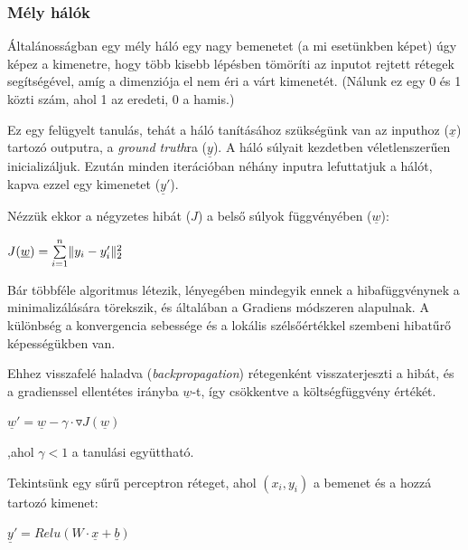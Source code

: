 

\subsubsection{Mély hálók}

Általánosságban egy mély háló egy nagy bemenetet (a mi esetünkben képet) úgy képez
a kimenetre, hogy több kisebb lépésben tömöríti az inputot rejtett rétegek segítségével,
amíg a dimenziója el nem éri a várt kimenetét. 
(Nálunk ez egy 0 és 1 közti szám, ahol 1 az eredeti, 0 a hamis.)


Ez egy felügyelt tanulás, tehát a háló tanításához szükségünk van az inputhoz ($ \underline{x} $) 
tartozó outputra, a \textit{ground truth}ra ($ \underline{y} $). 
A háló súlyait kezdetben véletlenszerűen inicializáljuk.
Ezután minden iterációban néhány inputra lefuttatjuk a hálót, 
kapva ezzel egy kimenetet ($ \underline{y}' $).

\noindent
Nézzük ekkor a négyzetes hibát ($ J $) a belső súlyok függvényében ($ \underline{w} $):

$ J(\underline{w}) = \sum\limits_{{i}=1}^{n} \lVert y_i-y_i'\rVert_2^2 $


Bár többféle algoritmus létezik, lényegében mindegyik ennek a hibafüggvénynek
a minimalizálására törekszik, és általában a Gradiens módszeren alapulnak.
A különbség a konvergencia sebessége és a lokális szélsőértékkel szembeni 
hibatűrő képességükben van.

Ehhez visszafelé haladva (\textit{backpropagation}) rétegenként visszaterjeszti a hibát,
és a gradienssel ellentétes irányba $ \underline{w} $-t, így csökkentve a költségfüggvény értékét.


$ \underline{w}' = \underline{w} - \gamma \cdot \triangledown J(\underline{w})$

\noindent
,ahol $ \gamma < 1 $ a tanulási együttható.




Tekintsünk egy sűrű perceptron réteget, ahol $ (x_i, y_i) $ a 
bemenet és a hozzá tartozó kimenet:

$ \underline{y}' = Relu(W \cdot \underline{x} + \underline{b}) $

